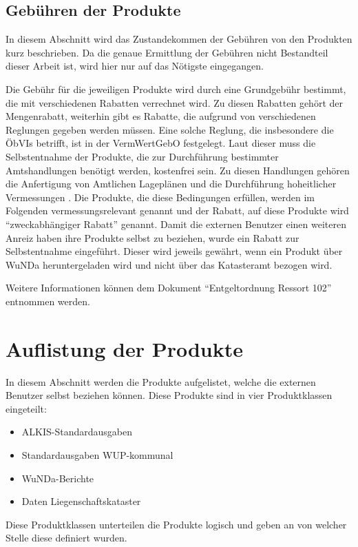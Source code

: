 \subsection{Gebühren der Produkte} \label{subsec:gebuehren}
In diesem Abschnitt wird das Zustandekommen der Gebühren von den Produkten kurz beschrieben.
Da die genaue Ermittlung der Gebühren nicht Bestandteil dieser Arbeit ist, wird hier nur auf das Nötigste eingegangen. 

Die Gebühr für die jeweiligen Produkte wird durch eine Grundgebühr bestimmt, die mit verschiedenen Rabatten verrechnet wird.
Zu diesen Rabatten gehört der Mengenrabatt, weiterhin gibt es Rabatte, die aufgrund von verschiedenen Reglungen gegeben werden müssen.
Eine solche Reglung, die insbesondere die \acp{ÖbVI} betrifft, ist in der \ac{VermWertGebO} festgelegt.
Laut dieser muss die Selbstentnahme der Produkte, die zur Durchführung bestimmter Amtshandlungen benötigt werden, kostenfrei sein.
Zu diesen Handlungen gehören die Anfertigung von Amtlichen Lageplänen und die Durchführung hoheitlicher Vermessungen \autocite[vgl.][]{wupp-wunda-oebvi}.
Die Produkte, die diese Bedingungen erfüllen, werden im Folgenden vermessungsrelevant genannt und der Rabatt, auf diese Produkte wird "`zweckabhängiger Rabatt"' genannt.
Damit die externen Benutzer einen weiteren Anreiz haben ihre Produkte selbst zu beziehen, wurde ein Rabatt zur Selbstentnahme eingeführt.
Dieser wird jeweils gewährt, wenn ein Produkt über \ac{WuNDa} heruntergeladen wird und nicht über das Katasteramt bezogen wird.

Weitere Informationen können dem Dokument "`Entgeltordnung Ressort 102"' \autocite{wupp-entgelt} entnommen werden.

\section{Auflistung der Produkte} \label{sec:produktliste}
In diesem Abschnitt werden die Produkte aufgelistet, welche die externen Benutzer selbst beziehen können. Diese Produkte sind in vier Produktklassen eingeteilt:
\begin{itemize}
	\item ALKIS-Standardausgaben
	\item Standardausgaben WUP-kommunal
	\item WuNDa-Berichte
	\item Daten Liegenschaftskataster
\end{itemize}
Diese Produktklassen unterteilen die Produkte logisch und geben an von welcher Stelle diese definiert wurden.

